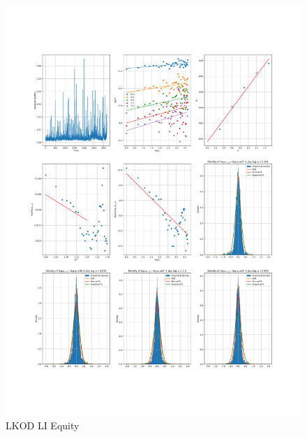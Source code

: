     \begin{figure}[h]
        \centering
        \includegraphics[width=\textwidth]{fig/LKOD LI Equity.pdf}
        \caption{LKOD LI Equity}
    \end{figure} 


